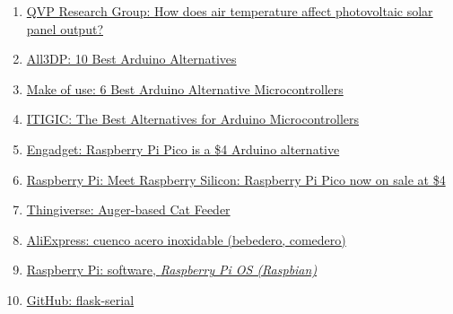 \documentclass[12pt]{article}
\begin{document}
\begin{enumerate}
			\item 
			\label{bib: QVP air temp affect solar panel output}
			\href{https://www.qpvgroup.org/blog/2019/2/3/how-does-air-temperature-affect-photovoltaic-solar-panel-output}{QVP Research Group: How does air temperature affect photovoltaic solar panel output?}
			
			\item 
			\label{bib: arduino alternatives}
			\href{https://all3dp.com/2/best-arduino-alternatives/}{All3DP: 10 Best Arduino Alternatives}
			
			\item 
			\label{bib: microcontrollers alternative to arduino}
			\href{https://www.makeuseof.com/tag/best-arduino-alternative-microcontrollers/}{Make of use: 6 Best Arduino Alternative Microcontrollers}
			
			\item 
			\label{bib: alternative to arduino}
			\href{https://itigic.com/best-alternatives-for-arduino-microcontrollers/}{ITIGIC: The Best Alternatives for Arduino Microcontrollers}
			
			\item 
			\label{bib: raspberry pi pico}
			\href{https://www.engadget.com/raspberry-pi-pico-microcontroller-154235348.html?guccounter=1}{Engadget: Raspberry Pi Pico is a \$4 Arduino alternative}
			
						
			\item 
			\label{bib: raspberry pi pico 2}
			\href{https://www.raspberrypi.org/blog/raspberry-pi-silicon-pico-now-on-sale/}{Raspberry Pi: Meet Raspberry Silicon: Raspberry Pi Pico now on sale at \$4}
			
						
			\item 
			\label{bib: thingiverse helices comedero}
			\href{https://www.thingiverse.com/thing:27854}{Thingiverse: Auger-based Cat Feeder}
			
						
			\item 
			\label{bib: AliExpress cuenco}
			\href{https://es.aliexpress.com/item/1005001632098703.html?spm=a2g0s.9042311.0.0.274263c05XMd1Y}{AliExpress: cuenco acero inoxidable (bebedero, comedero)}
			
						
			\item 
			\label{bib: raspbian}
			\href{https://www.raspberrypi.org/software/}{Raspberry Pi: software, \textit{Raspberry Pi OS (Raspbian)}}
			
						
			\item 
			\label{bib: flask serial}
			\href{https://github.com/RedFalsh/flask-serial/blob/master/README.md}{GitHub: flask-serial}
		

\end{enumerate}
\end{document}
